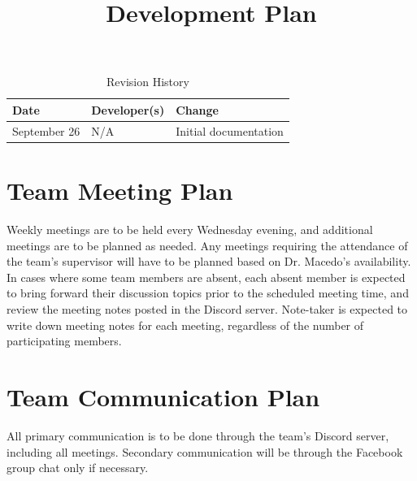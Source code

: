 \documentclass[12pt]{article}
\title{Development Plan\\\progname}
\author{\authname}
\date{}
\begin{document}
\begin{table}[hp]
\caption{Revision History} \label{TblRevisionHistory}
\begin{tabularx}{\textwidth}{llX}
\toprule
\textbf{Date} & \textbf{Developer(s)} & \textbf{Change}\\
\midrule
September 26 & N/A & Initial documentation\\
\bottomrule
\end{tabularx}
\end{table}

\newpage

\maketitle

\section{Team Meeting Plan}
Weekly meetings are to be held every Wednesday evening, and additional meetings are to be planned as needed. Any meetings requiring the attendance of the team's supervisor will have to be planned based on Dr. Macedo's availability. In cases where some team members are absent, each absent member is expected to bring forward their discussion topics prior to the scheduled meeting time, and review the meeting notes posted in the Discord server. Note-taker is expected to write down meeting notes for each meeting, regardless of the number of participating members.\\

\pagebreak

\section{Team Communication Plan}
All primary communication is to be done through the team's Discord server, including all meetings. Secondary communication will be through the Facebook group chat only if necessary.\\
\end{document}
